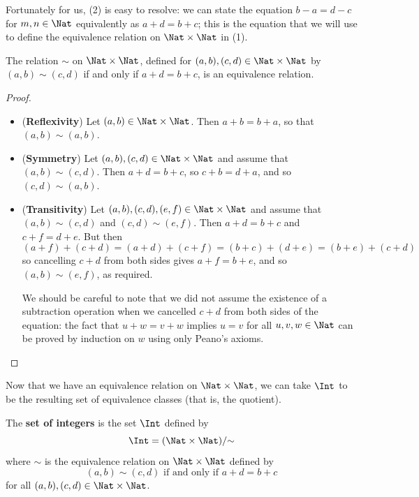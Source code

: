 Fortunately for us, (2) is easy to resolve: we can state the equation $b-a = d-c$ for $m,n \in \Nat$ equivalently as $a+d = b+c$; this is the equation that we will use to define the equivalence relation on $\Nat \times \Nat$ in (1).

\begin{lemma}
\label{lemEquivalenceRelationToConstructZFromN}
The relation $\sim$ on $\Nat \times \Nat$, defined for $(a,b), (c,d) \in \Nat \times \Nat$ by $(a,b) \sim (c,d)$ if and only if $a+d=b+c$, is an equivalence relation.
\end{lemma}

\begin{proof}
\fixlistskip%
\begin{itemize}
\item (\textbf{Reflexivity}) Let $(a,b) \in \Nat \times \Nat$. Then $a+b = b+a$, so that $(a,b) \sim (a,b)$.
\item (\textbf{Symmetry}) Let $(a,b), (c,d) \in \Nat \times \Nat$ and assume that $(a,b) \sim (c,d)$. Then $a+d=b+c$, so $c+b=d+a$, and so $(c,d) \sim (a,b)$.
\item (\textbf{Transitivity}) Let $(a,b), (c,d), (e,f) \in \Nat \times \Nat$ and assume that $(a,b) \sim (c,d)$ and $(c,d) \sim (e,f)$. Then $a+d=b+c$ and $c+f=d+e$. But then
$$ (a + f) + (c + d) = (a+d) + (c+f) = (b+c) + (d+e) = (b+e) + (c+d) $$
so cancelling $c+d$ from both sides gives $a+f = b+e$, and so $(a,b) \sim (e,f)$, as required.

We should be careful to note that we did not assume the existence of a subtraction operation when we cancelled $c+d$ from both sides of the equation: the fact that $u+w=v+w$ implies $u=v$ for all $u,v,w \in \Nat$ can be proved by induction on $w$ using only Peano's axioms.
\fixlistskip%
\end{itemize}
\end{proof}

Now that we have an equivalence relation on $\Nat \times \Nat$, we can take $\Int$ to be the resulting set of equivalence classes (that is, the quotient).

\begin{construction}
\label{cnsIntegersFromNaturalNumbers}
The \textbf{set of integers} is the set $\Int$ defined by
\[ \Int = (\Nat \times \Nat)/{\sim} \]
where $\sim$ is the equivalence relation on $\Nat \times \Nat$ defined by
\[ (a,b) \sim (c,d) \text{ if and only if } a+d=b+c \]
for all $(a,b),(c,d) \in \Nat \times \Nat$.
\end{construction}

